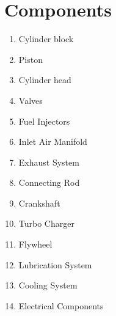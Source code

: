 \section{Components}

\begin{enumerate}

	\item Cylinder block
	\item Piston
	\item Cylinder head
	\item Valves
	\item Fuel Injectors
	\item Inlet Air Manifold
	\item Exhaust System
	\item Connecting Rod
	\item Crankshaft
	\item Turbo Charger
	\item Flywheel
	\item Lubrication System
	\item Cooling System
	\item Electrical Components

\end{enumerate}
